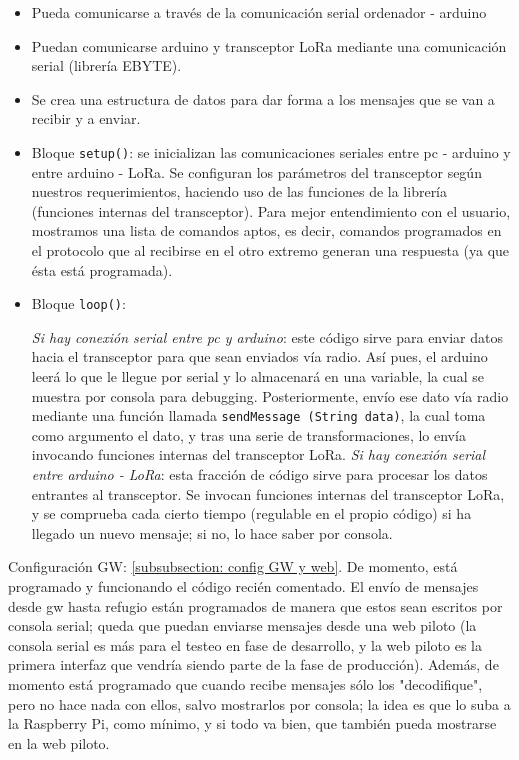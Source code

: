 \documentclass[12pt]{article}
\begin{document}
	\begin{itemize}
		\item Pueda comunicarse a través de la comunicación serial ordenador - arduino
		\item Puedan comunicarse arduino y transceptor LoRa mediante una comunicación serial (librería EBYTE). 
		\item Se crea una estructura de datos para dar forma a los mensajes que se van a recibir y a enviar.
		\item Bloque \texttt{setup()}: se inicializan las comunicaciones seriales entre pc - arduino y entre arduino - LoRa. Se configuran los parámetros del transceptor según nuestros requerimientos, haciendo uso de las funciones de la librería (funciones internas del transceptor). Para mejor entendimiento con el usuario, mostramos una lista de comandos aptos, es decir, comandos programados en el protocolo que al recibirse en el otro extremo generan una respuesta (ya que ésta está programada).

		\item Bloque \texttt{loop()}:
			\begin{outline}
			\1 \textit{Si hay conexión serial entre pc y arduino}: este código sirve para enviar datos hacia el transceptor para que sean enviados vía radio. Así pues, el arduino leerá lo que le llegue por serial  y lo almacenará en una variable, la cual se muestra por consola para debugging. Posteriormente, envío ese dato vía radio mediante una función llamada \texttt{sendMessage (String data)}, la cual toma como argumento el dato, y tras una serie de transformaciones, lo envía invocando funciones internas del transceptor LoRa.
			\1 \textit{Si hay conexión serial entre arduino - LoRa}: esta fracción de código sirve para procesar los datos entrantes al transceptor. Se invocan funciones internas del transceptor LoRa, y se comprueba cada cierto tiempo (regulable en el propio código) si ha llegado un nuevo mensaje; si no, lo hace saber por consola.
			\end{outline}
	\end{itemize}
	
	\noindent Configuración GW: \ref{subsubsection: config GW y web}. De momento, está programado y funcionando el código recién comentado. El envío de mensajes desde gw hasta refugio están programados de manera que estos sean escritos por consola serial; queda que puedan enviarse mensajes desde una web piloto (la consola serial es más para el testeo en fase de desarrollo, y la web piloto es la primera interfaz que vendría siendo parte de la fase de producción). Además, de momento está programado que cuando recibe mensajes sólo los "decodifique", pero no hace nada con ellos, salvo mostrarlos por consola; la idea es que lo suba a la Raspberry Pi, como mínimo, y si todo va bien, que también pueda mostrarse en la web piloto.\\
	
\end{document}
